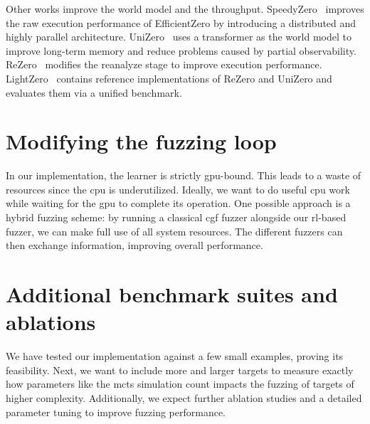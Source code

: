 Other works improve the world model and the throughput.
SpeedyZero~\cite{mei_speedyzero_2023} improves the raw execution performance of EfficientZero
by introducing a distributed and highly parallel architecture.
UniZero~\cite{pu_unizero_2025} uses a transformer as the world model to improve long-term memory
and reduce problems caused by partial observability.
ReZero~\cite{xuan_rezero_2024} modifies the reanalyze stage to improve execution performance.
LightZero~\cite{niu_lightzero_2023} contains reference implementations of ReZero and UniZero
and evaluates them via a unified benchmark.

\section{Modifying the fuzzing loop}

In our implementation, the learner is strictly \gls{gpu}-bound.
This leads to a waste of resources since the \gls{cpu} is underutilized.
Ideally, we want to do useful \gls{cpu} work while waiting for the \gls{gpu} to complete
its operation.
One possible approach is a hybrid fuzzing scheme: by running a classical \gls{cgf} fuzzer
alongside our \gls{rl}-based fuzzer, we can make full use of all system resources.
The different fuzzers can then exchange information, improving overall performance.

\section{Additional benchmark suites and ablations}

We have tested our implementation against a few small examples, proving its feasibility.
Next, we want to include more and larger targets to measure exactly how parameters
like the \gls{mcts} simulation count impacts the fuzzing of targets of higher complexity.
Additionally, we expect further ablation studies and a detailed parameter tuning to improve fuzzing
performance.
